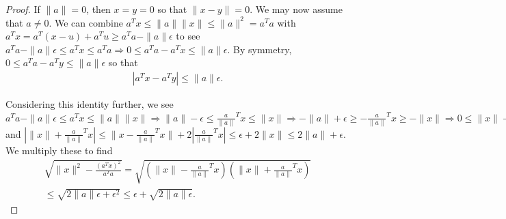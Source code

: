 \begin{proof}
If $\|a\| = 0$, then $x = y = 0$ so that $\|x - y\| = 0$.
We may now assume that $a \ne 0$.
We can combine
$
a^Tx  \le \|a\| \|x\| \le \|a\|^2 = a^T a
$
with
$
a^Tx = a^T(x - u) + a^T u \ge a^Ta - \|a\| \epsilon
$
to see
$
a^Ta - \|a\|\epsilon \le a^Tx \le a^Ta \Longrightarrow 0 \le a^Ta - a^Tx \le \|a\| \epsilon.
$
By symmetry, $0 \le a^Ta - a^Ty \le \|a\| \epsilon$ so that
\begin{align*}
\left| a^Tx - a^Ty \right| \le \|a\|\epsilon.
\end{align*}


% 
% 

Considering this identity further, we see
$
a^Ta - \|a\| \epsilon \le a^Tx \le \|a\|\|x\| 
\Longrightarrow \|a\| - \epsilon \le  \frac{a}{\|a\|}^T x \le \|x\| 
\Longrightarrow -\|a\| + \epsilon \ge  -\frac{a}{\|a\|}^T x \ge -\|x\| 
\Longrightarrow 0 \le \|x\| -\frac{a}{\|a\|}^T x \le \|x\|-\|a\| + \epsilon \le \epsilon
$
and
$
|\|x\| + \frac{a}{\|a\|}^T x| \le \|x - \frac{a}{\|a\|}^T x\| + 2|\frac{a}{\|a\|}^T x| \le \epsilon + 2\|x\| \le 2\|a\| + \epsilon
$.
We multiply these to find
\begin{align*}
\sqrt{\|x\|^2 - \frac{\left(a^Tx\right)^2}{a^Ta}}
= \sqrt{\left(\|x\| - \frac{a}{\|a\|}^Tx\right)\left(\|x\| + \frac{a}{\|a\|}^Tx\right)} \\
\le \sqrt{2\|a\|\epsilon + \epsilon^2} \le \epsilon + \sqrt{2\|a\|\epsilon}.
\end{align*}





\end{proof}
